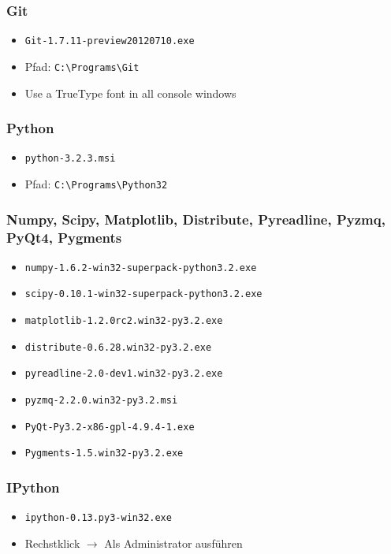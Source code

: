 \subsubsection{Git}
\begin{itemize}
  \item \texttt{Git-1.7.11-preview20120710.exe}
  \item Pfad: \verb|C:\Programs\Git|
  \item Use a TrueType font in all console windows
\end{itemize}

\subsubsection{Python}
\begin{itemize}
  \item \texttt{python-3.2.3.msi}
  \item Pfad: \verb|C:\Programs\Python32|
\end{itemize}

\subsubsection{Numpy, Scipy, Matplotlib, Distribute, Pyreadline, Pyzmq, PyQt4, Pygments}
\begin{itemize}
  \item \texttt{numpy-1.6.2-win32-superpack-python3.2.exe}
  \item \texttt{scipy-0.10.1-win32-superpack-python3.2.exe}
  \item \texttt{matplotlib-1.2.0rc2.win32-py3.2.exe}
  \item \texttt{distribute-0.6.28.win32-py3.2.exe}
  \item \texttt{pyreadline-2.0-dev1.win32-py3.2.exe}
  \item \texttt{pyzmq-2.2.0.win32-py3.2.msi}
  \item \texttt{PyQt-Py3.2-x86-gpl-4.9.4-1.exe}
  \item \texttt{Pygments-1.5.win32-py3.2.exe}
\end{itemize}

\subsubsection{IPython}
\begin{itemize}
  \item \texttt{ipython-0.13.py3-win32.exe}
  \item Rechstklick $\rightarrow$ Als Administrator ausführen
\end{itemize}

